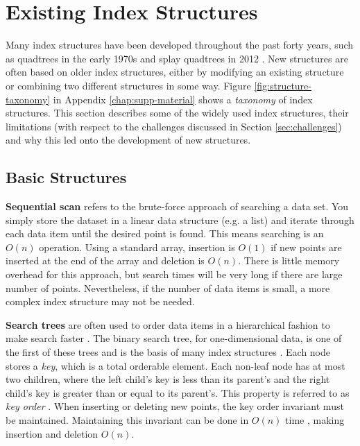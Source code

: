 \section{Existing Index Structures}
\label{sec:structures}

Many index structures have been developed throughout the past forty years, such as quadtrees in the early 1970s \cite{quadtree} and splay quadtrees in 2012 \cite{splay-quadtree}. New structures are often based on older index structures, either by modifying an existing structure or combining two different structures in some way. Figure \ref{fig:structure-taxonomy} in Appendix \ref{chap:supp-material} shows a \textit{taxonomy} of index structures. This section describes some of the widely used index structures, their limitations (with respect to the challenges discussed in Section \ref{sec:challenges}) and why this led onto the development of new structures.

\subsection{Basic Structures}

\textbf{Sequential scan} refers to the brute-force approach of searching a data set. You simply store the dataset in a linear data structure (e.g. a list) and iterate through each data item until the desired point is found. This means searching is an $O(n)$ operation. Using a standard array, insertion is $O(1)$ if new points are inserted at the end of the array and deletion is $O(n)$. There is little memory overhead for this approach, but search times will be very long if there are large number of points. Nevertheless, if the number of data items is small, a more complex index structure may not be needed.

\textbf{Search trees} are often used to order data items in a hierarchical fashion to make search faster \cite{introduction-to-algorithms}. The binary search tree, for one-dimensional data, is one of the first of these trees and is the basis of many index structures \cite{introduction-to-algorithms}. Each node stores a \textit{key}, which is a total orderable element. Each non-leaf node has at most two children, where the left child's key is less than its parent's and the right child's key is greater than or equal to its parent's. This property is referred to as \textit{key order} \cite{rst}. When inserting or deleting new points, the key order invariant must be maintained. Maintaining this invariant can be done in $O(n)$ time \cite{introduction-to-algorithms}, making insertion and deletion $O(n)$.

